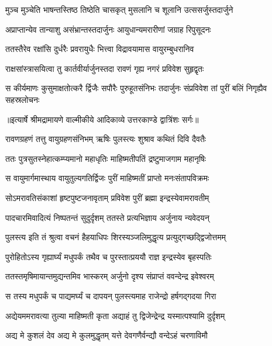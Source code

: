 \twolineshloka
{मुञ्च मुञ्चेति भाषन्तस्तिष्ठ तिष्ठेति चासकृत्}
{मुसलानि च शूलानि उत्ससर्जुस्तदार्जुने} %

\twolineshloka
{अप्राप्तान्येव तान्याशु असंभ्रान्तस्तदार्जुनः}
{आयुधान्यमरारीणां जग्राह रिपुसूदनः} %

\twolineshloka
{ततस्तैरेव रक्षांसि दुर्धरैः प्रवरायुधैः}
{भित्त्वा विद्रावयामास वायुरम्बुधरानिव} %

\twolineshloka
{राक्षसांस्त्रासयित्वा तु कार्तवीर्यार्जुनस्तदा}
{रावणं गृह्य नगरं प्रविवेश सुहृद्वृतः} %

\fourlineindentedshloka
{स कीर्यमाणः कुसुमाक्षतोत्करै}
{र्द्विजैः सपौरैः पुरुहूतसंनिभः}
{तदार्जुनः संप्रविवेश तां पुरीं}
{ बलिं निगृह्यैव सहस्रलोचनः} %


{॥इत्यार्षे श्रीमद्रामायणे वाल्मीकीये आदिकाव्ये उत्तरकाण्डे द्वात्रिंशः सर्गः॥}


\twolineshloka
{रावणग्रहणं तत्तु वायुग्रहणसंनिभम्}
{ऋषिः पुलस्त्यः शुश्राव कथितं दिवि दैवतैः} %

\twolineshloka
{ततः पुत्रसुतस्नेहात्कम्प्यमानो महाधृतिः}
{माहिष्मतीपतिं द्रष्टुमाजगाम महानृषिः} %

\twolineshloka
{स वायुमार्गमास्थाय वायुतुल्यगतिर्द्विजः}
{पुरीं माहिष्मतीं प्राप्तो मनःसंतापविक्रमः} %

\twolineshloka
{सोऽमरावतिसंकाशां हृष्टपुष्टजनावृताम्}
{प्रविवेश पुरीं ब्रह्मा इन्द्रस्येवामरावतीम्} %

\twolineshloka
{पादचारमिवादित्यं निष्पतन्तं सुदुर्दृशम्}
{ततस्ते प्रत्यभिज्ञाय अर्जुनाय न्यवेदयन्} %

\twolineshloka
{पुलस्त्य इति तं श्रुत्वा वचनं हैहयाधिपः}
{शिरस्यञ्जलिमुद्धृत्य प्रत्युद्गच्छद्द्विजोत्तमम्} %

\twolineshloka
{पुरोहितोऽस्य गृह्यार्घ्यं मधुपर्कं तथैव च}
{पुरस्तात्प्रययौ राज्ञ इन्द्रस्येव बृहस्पतिः} %

\twolineshloka
{ततस्तमृषिमायान्तमुद्यन्तमिव भास्करम्}
{अर्जुनो दृश्य संप्राप्तं ववन्देन्द्र इवेश्वरम्} %

\twolineshloka
{स तस्य मधुपर्कं च पाद्यमर्घ्यं च दापयन्}
{पुलस्त्यमाह राजेन्द्रो हर्षगद्गदया गिरा} %

\twolineshloka
{अद्येयममरावत्या तुल्या माहिष्मती कृता}
{अद्याहं तु द्विजेन्द्रेन्द्र यस्मात्पश्यामि दुर्दृशम्} %

\twolineshloka
{अद्य मे कुशलं देव अद्य मे कुलमुद्धृतम्}
{यत्ते देवगणैर्वन्द्यौ वन्देऽहं चरणाविमौ} %

